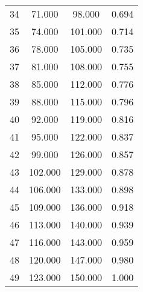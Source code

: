 \begin{tabular}{cccc}
  34 & 71.000 & 98.000 & 0.694 \\ 
  35 & 74.000 & 101.000 & 0.714 \\ 
  36 & 78.000 & 105.000 & 0.735 \\ 
  37 & 81.000 & 108.000 & 0.755 \\ 
  38 & 85.000 & 112.000 & 0.776 \\ 
  39 & 88.000 & 115.000 & 0.796 \\ 
  40 & 92.000 & 119.000 & 0.816 \\ 
  41 & 95.000 & 122.000 & 0.837 \\ 
  42 & 99.000 & 126.000 & 0.857 \\ 
  43 & 102.000 & 129.000 & 0.878 \\ 
  44 & 106.000 & 133.000 & 0.898 \\ 
  45 & 109.000 & 136.000 & 0.918 \\ 
  46 & 113.000 & 140.000 & 0.939 \\ 
  47 & 116.000 & 143.000 & 0.959 \\ 
  48 & 120.000 & 147.000 & 0.980 \\ 
  49 & 123.000 & 150.000 & 1.000 \\ 
   \hline
\end{tabular}

